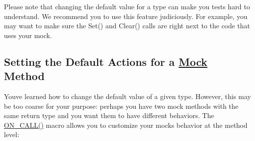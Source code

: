 Please note that changing the default value for a type can make you tests hard to understand. We recommend you to use this feature judiciously. For example, you may want to make sure the {\ttfamily Set()} and {\ttfamily Clear()} calls are right next to the code that uses your mock.

\subsection*{Setting the Default Actions for a \mbox{\hyperlink{class_mock}{Mock}} Method}

You\textquotesingle{}ve learned how to change the default value of a given type. However, this may be too coarse for your purpose\+: perhaps you have two mock methods with the same return type and you want them to have different behaviors. The {\ttfamily \mbox{\hyperlink{googletest-master_2googlemock_2include_2gmock_2gmock-spec-builders_8h_a5b12ae6cf84f0a544ca811b380c37334}{O\+N\+\_\+\+C\+A\+L\+L()}}} macro allows you to customize your mock\textquotesingle{}s behavior at the method level\+:


